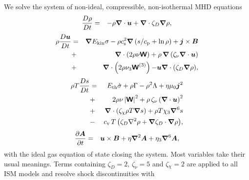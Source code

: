 \documentclass[preprint2]{aastex63}
\newcommand\ESK{E_{\rm kin}}
\newcommand\EST{E_{\rm th}}
\newcommand{\vect}[1]{{{\mbox{\boldmath $#1$}}}}%
\newcommand{\mathbfss}[1]{\textbf{\textsf{#1}}}
\begin{document}
 We solve the system of non-ideal, compressible, non-isothermal MHD equations
  \begin{eqnarray}
  \label{eq:mass}
    \frac{D\rho}{Dt} &=& 
    -\rho \vect\nabla \cdot \vect{u}
    +\vect\nabla \cdot\zeta_D\vect\nabla\rho,
  \end{eqnarray}
  \begin{eqnarray}
  \label{eq:mom}
    \rho\frac{D\vect{u}}{Dt} &=& 
    \vect\nabla{\ESK\sigma}
    -\rho c_{\rm s}^2\vect\nabla\left({s}/{c_{\rm p}}+\ln\rho\right)
    +\vect{j}\times\vect{B}
    \nonumber\\
    &+&\vect\nabla\cdot \left(2\rho\nu{\mathbfss W}\right)
    +\rho\,\vect\nabla\left(\zeta_{\nu}\vect\nabla \cdot \vect{u} \right)
    \nonumber\\
    &+&\vect\nabla\cdot \left(2\rho\nu_3{\mathbfss W}^{(3)}\right)
  {-\vect u\vect{\nabla}\cdot\left(\zeta_D\vect{\nabla}\rho\right)},
  \end{eqnarray}
  \begin{eqnarray}
  \label{eq:ent}
    \rho T\frac{D s}{Dt} &=&
     \EST\dot\sigma +\rho\Gamma
    -\rho^2\Lambda +\eta\mu_0\vect{j}^2 
    \nonumber\\
    &+&2 \rho \nu\left|{\mathbfss W}\right|^{2}
    +\rho\,\zeta_{\nu}\left(\vect\nabla \cdot \vect{u} \right)^2
    \nonumber\\
    &+&\vect\nabla\cdot\left(\zeta_\chi\rho T\vect\nabla s\right)
    +\rho T\chi_3\vect\nabla^6 s
    \nonumber\\
    &-& {c_{\rm{v}}\,T \left(
    \zeta_D\nabla^2\rho + \vect\nabla\zeta_D\cdot\vect\nabla\rho\right)},
  \end{eqnarray}
  \begin{eqnarray}
  \label{eq:ind}
    \frac{\partial \vect{A}}{\partial t} &=&
    \vect{u}\times\vect{B}
    +\eta\vect\nabla^2\vect{A}
    +\eta_3\vect\nabla^6\vect{A},
  \end{eqnarray}
 with the ideal gas equation of state closing the system.
 Most variables take their usual meanings.
 Terms containing $\zeta_D{=2},\,\zeta_\nu=5$ and $\zeta{_\chi=2}$
 {are applied to all ISM models and} resolve shock discontinuities with
\end{document}
